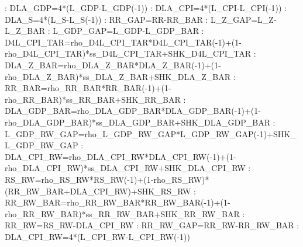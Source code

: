 \documentclass{article}%
\begin{document}
   :  DLA\_GDP=4*(L\_GDP{-}L\_GDP({-}1))\newline%
   :  DLA\_CPI=4*(L\_CPI{-}L\_CPI({-}1))\newline%
   :  DLA\_S=4*(L\_S{-}L\_S({-}1))\newline%
   :  RR\_GAP=RR{-}RR\_BAR\newline%
   :  L\_Z\_GAP=L\_Z{-}L\_Z\_BAR\newline%
   :  L\_GDP\_GAP=L\_GDP{-}L\_GDP\_BAR\newline%
   :  D4L\_CPI\_TAR=rho\_D4L\_CPI\_TAR*D4L\_CPI\_TAR({-}1)+(1{-}rho\_D4L\_CPI\_TAR)*ss\_D4L\_CPI\_TAR+SHK\_D4L\_CPI\_TAR\newline%
   :  DLA\_Z\_BAR=rho\_DLA\_Z\_BAR*DLA\_Z\_BAR({-}1)+(1{-}rho\_DLA\_Z\_BAR)*ss\_DLA\_Z\_BAR+SHK\_DLA\_Z\_BAR\newline%
   :  RR\_BAR=rho\_RR\_BAR*RR\_BAR({-}1)+(1{-}rho\_RR\_BAR)*ss\_RR\_BAR+SHK\_RR\_BAR\newline%
   :  DLA\_GDP\_BAR=rho\_DLA\_GDP\_BAR*DLA\_GDP\_BAR({-}1)+(1{-}rho\_DLA\_GDP\_BAR)*ss\_DLA\_GDP\_BAR+SHK\_DLA\_GDP\_BAR\newline%
   :  L\_GDP\_RW\_GAP=rho\_L\_GDP\_RW\_GAP*L\_GDP\_RW\_GAP({-}1)+SHK\_L\_GDP\_RW\_GAP\newline%
   :  DLA\_CPI\_RW=rho\_DLA\_CPI\_RW*DLA\_CPI\_RW({-}1)+(1{-}rho\_DLA\_CPI\_RW)*ss\_DLA\_CPI\_RW+SHK\_DLA\_CPI\_RW\newline%
   :  RS\_RW=rho\_RS\_RW*RS\_RW({-}1)+(1{-}rho\_RS\_RW)*(RR\_RW\_BAR+DLA\_CPI\_RW)+SHK\_RS\_RW\newline%
   :  RR\_RW\_BAR=rho\_RR\_RW\_BAR*RR\_RW\_BAR({-}1)+(1{-}rho\_RR\_RW\_BAR)*ss\_RR\_RW\_BAR+SHK\_RR\_RW\_BAR\newline%
   :  RR\_RW=RS\_RW{-}DLA\_CPI\_RW\newline%
   :  RR\_RW\_GAP=RR\_RW{-}RR\_RW\_BAR\newline%
   :  DLA\_CPI\_RW=4*(L\_CPI\_RW{-}L\_CPI\_RW({-}1))\newline%
\end{document}

